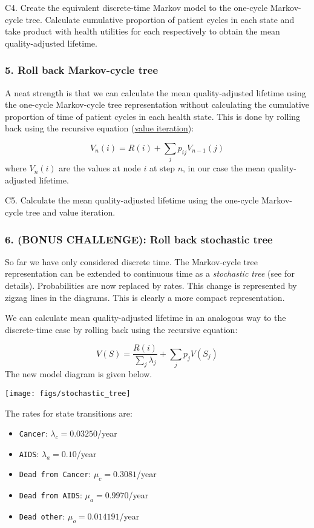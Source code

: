 \documentclass[]{book}
\providecommand{\tightlist}{%
  \setlength{\itemsep}{0pt}\setlength{\parskip}{0pt}}
\begin{document}
C4. Create the equivalent discrete-time Markov model to the one-cycle Markov-cycle tree. Calculate cumulative proportion of patient cycles in each state and take product with health utilities for each respectively to obtain the mean quality-adjusted lifetime.

\hypertarget{C5}{%
\subsubsection{5. Roll back Markov-cycle tree}\label{C5}}

A neat strength is that we can calculate the mean quality-adjusted lifetime using the one-cycle Markov-cycle tree representation without calculating the cumulative proportion of time of patient cycles in each health state.
This is done by rolling back using the recursive equation (\href{https://en.wikipedia.org/wiki/Markov_decision_process\#Value_iteration}{value iteration}):

\[
V_n(i) = R(i) + \sum_j p_{ij} V_{n-1}(j)
\]
where \(V_n(i)\) are the values at node \(i\) at step \(n\), in our case the mean quality-adjusted lifetime.

C5. Calculate the mean quality-adjusted lifetime using the one-cycle Markov-cycle tree and value iteration.

\hypertarget{C6}{%
\subsubsection{6. (BONUS CHALLENGE): Roll back stochastic tree}\label{C6}}

So far we have only considered discrete time.
The Markov-cycle tree representation can be extended to continuous time as a \emph{stochastic tree}
(see \citet{Hazen2014} for details).
Probabilities are now replaced by rates.
This change is represented by zigzag lines in the diagrams.
This is clearly a more compact representation.

We can calculate mean quality-adjusted lifetime in an analogous way to the discrete-time case by rolling back using the recursive equation:

\[
V(S) = \frac{R(i)}{\sum_j \lambda_j} + \sum_j p_j V(S_j)
\]
The new model diagram is given below.

\texttt{[image: figs/stochastic\_tree]}

The rates for state transitions are:

\begin{itemize}
\tightlist
\item
  \texttt{Cancer}: \(\lambda_c = 0.03250\)/year
\item
  \texttt{AIDS}: \(\lambda_a = 0.10\)/year
\item
  \texttt{Dead\ from\ Cancer}: \(\mu_c = 0.3081\)/year
\item
  \texttt{Dead\ from\ AIDS}: \(\mu_a = 0.9970\)/year
\item
  \texttt{Dead\ other}: \(\mu_o = 0.014191\)/year
\end{itemize}
\end{document}
